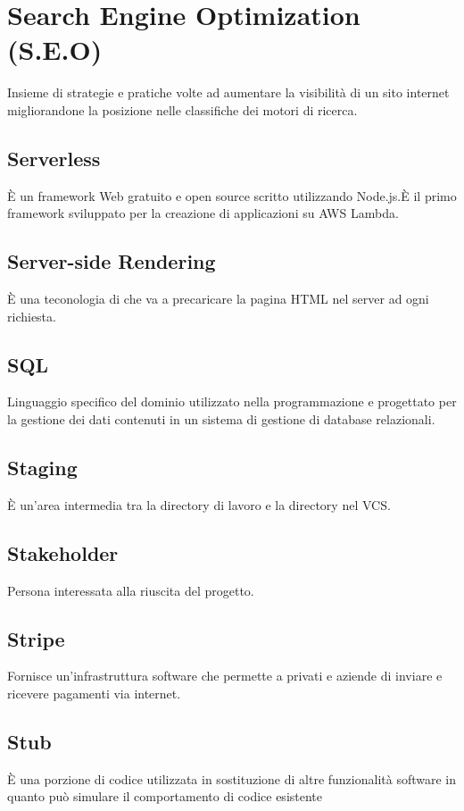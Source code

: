 \section{}
\section*{Search Engine Optimization (S.E.O)} Insieme di strategie e pratiche volte ad aumentare la visibilità di un sito internet migliorandone la posizione nelle classifiche dei motori di ricerca.
\subsection*{Serverless} È un framework Web gratuito e open source scritto utilizzando Node.js.È il primo framework sviluppato
per la creazione di applicazioni su AWS Lambda.

\subsection*{Server-side Rendering} È una teconologia di che va a precaricare la pagina HTML nel server ad ogni richiesta.

\subsection*{SQL} Linguaggio specifico del dominio utilizzato nella programmazione e progettato per la gestione dei dati
contenuti in un sistema di gestione di database relazionali.

\subsection*{Staging} È un'area intermedia tra la directory di lavoro e la directory nel VCS.

\subsection*{Stakeholder} Persona interessata alla riuscita del progetto.

\subsection*{Stripe} Fornisce un'infrastruttura software che permette a privati e aziende di inviare e ricevere pagamenti via internet.

\subsection*{Stub} È una porzione di codice utilizzata in sostituzione di altre funzionalità software in quanto può simulare il comportamento di codice esistente